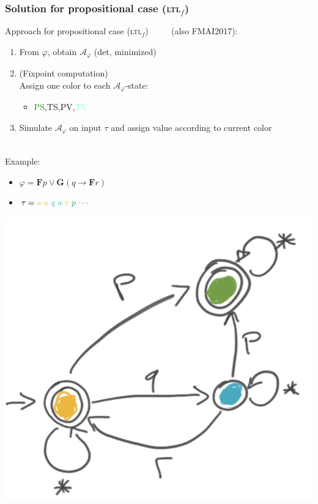 \documentclass[xcolor=dvipsnames,aspectratio=169]{beamer}
\newcommand{\A}{\mathcal A\xspace}
\newcommand{\always}{\mathbf{G}\xspace}
\newcommand{\eventually}{\mathbf{F}\xspace}
\newcommand{\ltlf}{\textsc{ltl}$_f$\xspace}
\newcommand{\yellow}[1]{\textcolor{Dandelion}{#1}}
\newcommand{\blue}[1]{\textcolor{Aquamarine}{#1}}
\newcommand{\green}[1]{\textcolor{ForestGreen}{#1}}
\newcommand{\red}[1]{\textcolor{BrickRed}{#1}}
\begin{document}
\begin{frame}
\frametitle{Solution for propositional case (\ltlf)}

Approach for propositional case (\ltlf)
~~~~\cite{monitoring11,MGMM14} (also FMAI2017):  
\begin{enumerate}
	\item From $\varphi$, obtain $\A_\varphi$ (det, minimized)
	\item (Fixpoint computation)\\ 
		Assign one color to each $\A_\varphi$-state:
	\begin{itemize}
		\item \green{PS},\yellow{TS},\red{PV},\blue{TV}
	\end{itemize}
	\item Simulate $\A_\varphi$ on input $\tau$ and assign value according to current color
\end{enumerate}

~\\

Example:
\begin{itemize}
	\item $\varphi=\eventually p\lor \always(q\rightarrow\eventually r)$
	\item $\tau=\yellow{a}~\yellow{a}~\blue{q}~\blue{a}~\yellow{r}~\green{p}~\green{\cdots}$
\end{itemize}

\begin{center}
	\includegraphics[scale=.2]{figures/a_phi_colored}
\end{center}
\end{frame}
\end{document}
